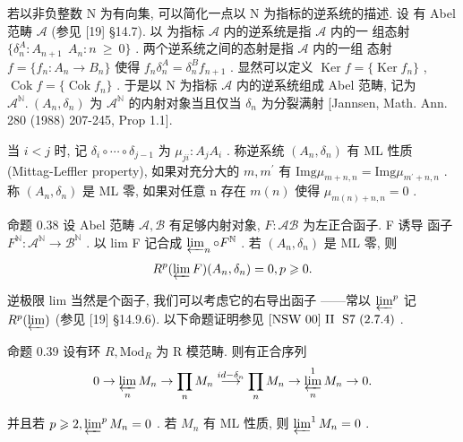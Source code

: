 \documentclass[]{article}
\begin{document}
{若以非负整数 N 为有向集, 可以简化一点以 N 为指标的逆系统的描述. 设 有 Abel 范畴 $\mathcal { A }$ (参见 [19] §14.7). 以 为指标 $\mathcal { A }$ 内的逆系统是指 $\mathcal { A }$ 内的一 组态射 $\{ \delta _ { n } ^ { A } : A _ { n + 1 } \  \ A _ { n } : n \ \geqslant \ 0 \}$ . 两个逆系统之间的态射是指 $\mathcal { A }$ 内的一组 态射 $f = \{ f _ { n } : A _ { n } \to B _ { n } \}$ 使得 $f _ { n } \delta _ { n } ^ { A } = \delta _ { n } ^ { B } f _ { n + 1 }$ . 显然可以定义 $\operatorname { K e r } f = \{ \operatorname { K e r } f _ { n } \}$ , $\operatorname { C o k } f = \{ \operatorname { C o k } f _ { n } \}$ . 于是以 N 为指标 $\mathcal { A }$ 内的逆系统组成 Abel 范畴, 记为 $\mathcal { A } ^ { \mathbb { N } } . ~ ( A _ { n } , \delta _ { n } )$ 为 $\mathcal { A } ^ { \mathbb { N } }$ 的内射对象当且仅当 $\delta _ { n }$ 为分裂满射 [Jannsen, Math. Ann. 280 (1988) 207-245, Prop 1.1]. 

当 $i < j$ 时, 记 $\delta _ { i } \circ \cdots \circ \delta _ { j - 1 }$ 为 $\mu _ { j i } : A _ { j }  A _ { i }$ . 称逆系统 $( A _ { n } , \delta _ { n } )$ 有 ML 性质 (Mittag-Leffler property), 如果对充分大的 $m , m ^ { \prime }$ 有 $\mathrm { I m g } \mu _ { m + n , n } = \mathrm { I m g } \mu _ { m ^ { \prime } + n , n }$ . 称 $( A _ { n } , \delta _ { n } )$ 是 ML 零, 如果对任意 n 存在 $m ( n )$ 使得 $\mu _ { m ( n ) + n , n } = 0$ . 

命题 0.38 设 Abel 范畴 $\mathcal { A } , \mathcal { B }$ 有足够内射对象, $F : \mathcal { A }  \mathcal { B }$ 为左正合函子. F 诱导 函子 $F ^ { \mathbb { N } } : \mathcal { A } ^ { \mathbb { N } } \to \mathcal { B } ^ { \mathbb { N } }$ . 以 lim F 记合成 $\varprojlim _ { n } \circ F ^ { \mathbb { N } }$ . 若 $( A _ { n } , \delta _ { n } )$ 是 ML 零, 则 $$
R ^ {p} (\varprojlim F) (A _ {n}, \delta_ {n}) = 0, p \geqslant 0.
$$

逆极限 lim 当然是个函子, 我们可以考虑它的右导出函子 ——常以 $\varprojlim ^ { p }$ 记 $R ^ { p } ( \varprojlim )$ (参见 [19] §14.9.6). 以下命题证明参见 $\mathrm { \small { [ N S W ~ 0 0 ] ~ I I ~ \ S 7 ~ ( 2 . 7 . 4 ) } }$ . 

命题 0.39 设有环 $R , \mathrm { M o d } _ { R }$ 为 R 模范畴. 则有正合序列 $$
0 \to \varprojlim_ {n} M _ {n} \to \prod_ {n} M _ {n} \stackrel {{i d - \delta_ {n}}} {{\longrightarrow}} \prod_ {n} M _ {n} \to \varprojlim_ {n} ^ {1} M _ {n} \to 0.
$$

并且若 $p \geqslant 2 , \varprojlim ^ { p } M _ { n } = 0$ . 若 $M _ { n }$ 有 ML 性质, 则 $\varprojlim ^ { 1 } M _ { n } = 0$ . 

}
\end{document}
